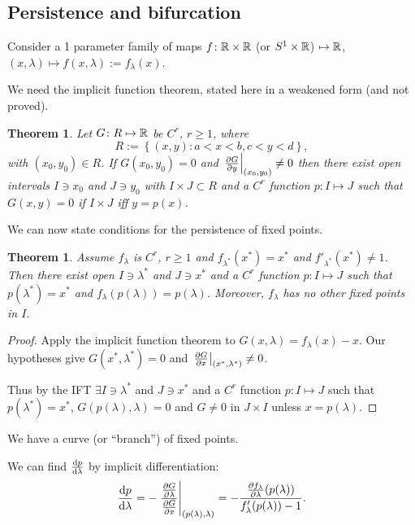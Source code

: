 \documentclass{notes}
\theoremstyle{plain}
\newtheorem{theorem}[proposition]{Theorem}
\begin{document}
\subsection{Persistence and bifurcation}

Consider a 1 parameter family of maps $f \colon \mathbb{R} \times \mathbb{R}$
(or $S^1 \times \mathbb{R}$) $\mapsto \mathbb{R}$, $(x,\lambda) \mapsto f(x,\lambda)
:= f_\lambda(x)$.

We need the implicit function theorem, stated here in a weakened form
(and not proved).

\begin{theorem}\label{thm:IFT}
Let $G \colon R \mapsto \mathbb{R}$ be $C^r$, $r \ge 1$, where
\[
R := \left\{ (x,y) : a < x < b, c < y < d \right\},
\]
with $(x_0,y_0) \in R$.  If $G(x_0,y_0) = 0$ and
$\left.\frac{\partial G}{\partial y}\right|_{(x_0,y_0)} \neq 0$ then there exist open
intervals $I \ni x_0$ and $J \ni y_0$ with $I \times J \subset R$
and a $C^r$ function $p \colon I \mapsto J$ such that $G(x,y) = 0$
if $I \times J$ iff $y=p(x)$.
\end{theorem}

We can now state conditions for the persistence of fixed points.

\begin{theorem}\label{thm:fpp}
Assume $f_\lambda$ is $C^r$, $r \ge 1$ and $f_{\lambda^\ast}(x^\ast)
= x^\ast$ and $f'_{\lambda^\ast}(x^\ast) \neq 1$.  Then there exist
open $I \ni \lambda^\ast$ and $J \ni x^\ast$ and a $C^r$ function
$p \colon I \mapsto J$ such that $p(\lambda^\ast) = x^\ast$ and
$f_\lambda(p(\lambda)) = p(\lambda)$.  Moreover, $f_\lambda$ has no
other fixed points in $I$.
\end{theorem}

\begin{proof}
  Apply the implicit function theorem to $G(x,\lambda) = f_\lambda(x)
  - x$.  Our hypotheses give $G(x^\ast,\lambda^\ast) = 0$ and
  $\left.\frac{\partial G}{\partial x}\right|_{(x^\ast,\lambda^\ast)} \neq 0$.
  
  Thus by the IFT $\exists I \ni \lambda^\ast$ and $J \ni x^\ast$ and
  a $C^r$ function $p \colon I \mapsto J$ such that $p(\lambda^\ast) =
  x^\ast$, $G(p(\lambda),\lambda) = 0$ and $G \neq 0$ in
  $J \times I$ unless $x = p(\lambda)$.
\end{proof}

We have a curve (or ``branch'') of fixed points.

\vspace{1.5in}

We can find $\frac{\mathrm{d} p}{\mathrm{d}\lambda}$ by implicit differentiation:
\[
\frac{\mathrm{d} p}{\mathrm{d}\lambda} = - \left.\frac{\frac{\partial G}{\partial \lambda}}{\frac{\partial G}{\partial x}}
\right|_{(p(\lambda),\lambda)} = -
\frac{\frac{\partial f_\lambda}{\partial \lambda}(p(\lambda))}{f'_\lambda(p(\lambda)) - 1}.
\]
\end{document}

